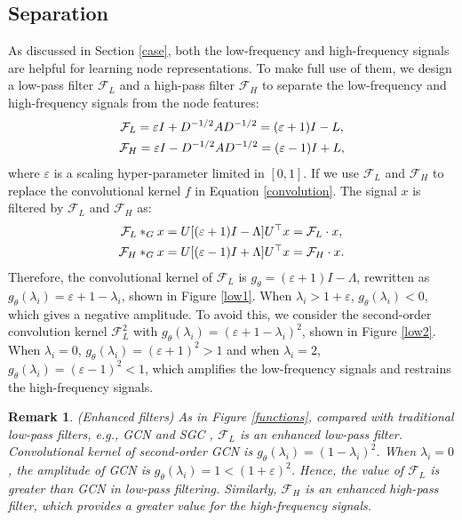 \documentclass[letterpaper]{article} %
\newtheorem{remark}{Remark}
\begin{document}
\subsection{Separation}
As discussed in Section \ref{case}, both the low-frequency and high-frequency signals are helpful for learning node representations.
To make full use of them, we design a low-pass filter $\mathcal{F}_{L}$ and a high-pass filter $\mathcal{F}_{H}$ to separate the low-frequency and high-frequency signals from the node features:
\begin{gather}
	\mathcal{F}_{L} = \varepsilon I + D^{-1/2}AD^{-1/2} = (\varepsilon+1) I - L, \notag \\
	\mathcal{F}_{H} = \varepsilon I - D^{-1/2}AD^{-1/2} = (\varepsilon-1) I + L, \label{filters}
\end{gather}
where $\varepsilon$ is a scaling hyper-parameter limited in $[0, 1]$. If we use $\mathcal{F}_{L}$ and $\mathcal{F}_{H}$ to replace the convolutional kernel $f$ in Equation \ref{convolution}. The signal $x$ is filtered by $\mathcal{F}_{L}$ and $\mathcal{F}_{H}$ as:
\begin{gather}
	\mathcal{F}_{L} *_{G} x = U[(\varepsilon+1) I - \Lambda]U^{\top}x = \mathcal{F}_{L} \cdot x, \notag \\
	\mathcal{F}_{H} *_{G} x = U[(\varepsilon-1) I + \Lambda]U^{\top}x = \mathcal{F}_{H} \cdot x.
	\label{filterings}
\end{gather}
Therefore, the convolutional kernel of $\mathcal{F}_{L}$ is $g_{\theta}=(\varepsilon+1) I - \Lambda$, rewritten as $g_{\theta}(\lambda_{i})=\varepsilon+1-\lambda_{i}$, shown in Figure \ref{low1}. When $\lambda_{i} > 1+\varepsilon$, $g_{\theta}(\lambda_{i}) < 0$, which gives a negative amplitude.
To avoid this, we consider the second-order convolution kernel $\mathcal{F}_{L}^{2}$ with $g_{\theta}(\lambda_{i})=(\varepsilon+1-\lambda_{i})^{2}$, shown in Figure \ref{low2}. When $\lambda_{i} = 0$, $g_{\theta}(\lambda_{i}) = (\varepsilon+1)^{2} > 1$ and when $\lambda_{i} = 2$, $g_{\theta}(\lambda_{i}) = (\varepsilon-1)^{2} < 1$, which amplifies the low-frequency signals and restrains the high-frequency signals.
\begin{remark}
	(Enhanced filters) As in Figure \ref{functions}, compared with traditional low-pass filters, e.g., GCN and SGC \cite{SGC}, $\mathcal{F}_{L}$ is an enhanced low-pass filter. Convolutional kernel of second-order GCN is $g_{\theta}(\lambda_{i})=(1-\lambda_{i})^{2}$. When $\lambda_{i}=0$, the amplitude of GCN is $g_{\theta}(\lambda_{i})=1<(1+\varepsilon)^{2}$. Hence, the value of $\mathcal{F}_{L}$ is greater than GCN in low-pass filtering. Similarly, $\mathcal{F}_{H}$ is an enhanced high-pass filter, which provides a greater value for the high-frequency signals.
\end{remark}
\end{document}

